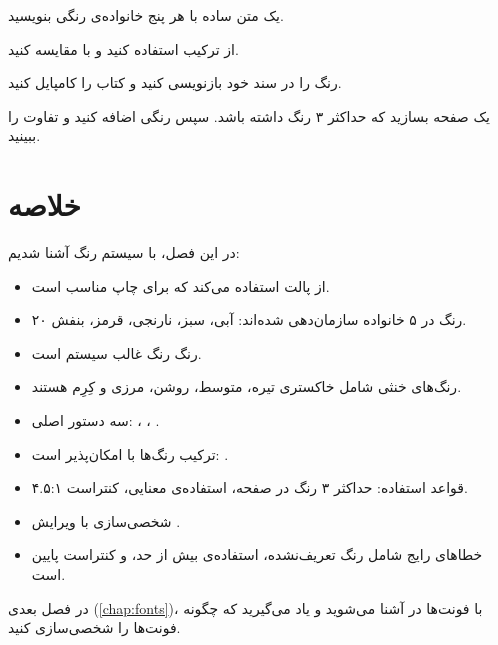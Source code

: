 \begin{exercise}
    یک متن ساده با هر پنج خانواده‌ی رنگی
    بنویسید.
    \label{exc:colors-basic}
\end{exercise}

\begin{exercise}
    از ترکیب  استفاده کنید
    و با  مقایسه کنید.
    \label{exc:colors-mixing}
\end{exercise}

\begin{exercise}
    رنگ  را در سند خود بازنویسی
    کنید و کتاب را کامپایل کنید.
    \label{exc:colors-override}
\end{exercise}

\begin{exercise}
    یک صفحه بسازید که حداکثر ۳ رنگ داشته
    باشد. سپس رنگی اضافه کنید و تفاوت را
    ببینید.
    \label{exc:colors-limit}
\end{exercise}

\section{خلاصه}
\label{sec:colors-summary}

در این فصل، با سیستم رنگ 
آشنا شدیم:

\begin{itemize}
    \item {} از پالت 
    استفاده می‌کند که برای چاپ مناسب است.

    \item ۲۰ رنگ در ۵ خانواده سازمان‌دهی
    شده‌اند: آبی، سبز، نارنجی، قرمز، بنفش.

    \item رنگ  رنگ غالب
    سیستم است.

    \item رنگ‌های خنثی شامل خاکستری تیره،
    متوسط، روشن، مرزی و کِرِم هستند.

    \item سه دستور اصلی: ،
    ، .

    \item ترکیب رنگ‌ها با \lr{!} امکان‌پذیر
    است: .

    \item قواعد استفاده: حداکثر ۳ رنگ در
    صفحه، استفاده‌ی معنایی، کنتراست ۴.۵:۱.

    \item شخصی‌سازی با ویرایش
    .

    \item خطاهای رایج شامل رنگ تعریف‌نشده،
    استفاده‌ی بیش از حد، و کنتراست پایین
    است.
\end{itemize}

در فصل بعدی (\cref{chap:fonts})، با فونت‌ها
در  آشنا می‌شوید و یاد می‌گیرید
که چگونه فونت‌ها را شخصی‌سازی کنید.
